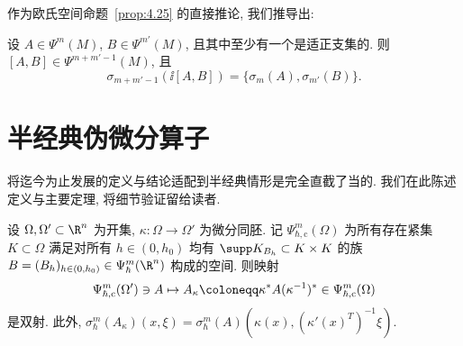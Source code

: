 作为欧氏空间命题~\ref{prop:4.25} 的直接推论, 我们推导出:

\begin{corollary}[换位子的主符号]\label{cor:5.82}
设 $A \in \Psi^m(M)$, $B \in \Psi^{m'}(M)$, 且其中至少有一个是适正支集的. 则 $[A, B] \in \Psi^{m+m'-1}(M)$, 且
\begin{equation}\label{eq:5.194}
    \sigma_{m+m'-1}(\ii [A, B]) = \{\sigma_m(A), \sigma_{m'}(B)\}.
\end{equation}
\end{corollary}

\section{半经典伪微分算子}\label{sec:5.15}
%

将迄今为止发展的定义与结论适配到半经典情形是完全直截了当的. 我们在此陈述定义与主要定理, 将细节验证留给读者.

\begin{theorem}[坐标变换下的半经典伪微分算子]\label{thm:5.83}
设 $\Omega, \Omega' \subset \R^n$ 为开集, $\kappa \colon \Omega \to \Omega'$ 为微分同胚. 记 $\Psi_{\hbar,\mathrm{c}}^m(\Omega)$ 为所有存在紧集 $K \subset \Omega$ 满足对所有 $h \in (0, h_0)$ 均有 $\supp K_{B_h} \subset K \times K$ 的族 $B = (B_h)_{h\in(0, h_0)} \in \Psi_\hbar^m(\R^n)$ 构成的空间. 则映射
\begin{equation}\label{eq:5.195}
    \Psi_{\hbar,\mathrm{c}}^m(\Omega') \ni A \mapsto A_\kappa \defeq \kappa^* A (\kappa^{-1})^* \in \Psi_{\hbar,\mathrm{c}}^m(\Omega)
\end{equation}
是双射. 此外, $\sigma_\hbar^m(A_\kappa)(x, \xi) = \sigma_\hbar^m(A)(\kappa(x), (\kappa'(x)^T)^{-1}\xi)$.
\end{theorem}

